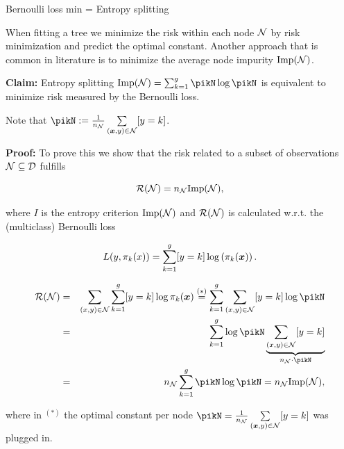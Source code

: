 \begin{vbframe}{Bernoulli loss min = Entropy splitting}

When fitting a tree we minimize the risk within each node $\mathcal{N}$ by risk minimization and predict the optimal constant. Another approach that is common in literature is to minimize the average node impurity $\text{Imp}(\mathcal{N})$. 

\vspace*{0.2cm}

\textbf{Claim:} Entropy splitting $\text{Imp}(\Np) = \sum_{k = 1}^g \pikN \log \pikN$ is equivalent to minimize risk measured by the Bernoulli loss. 

\begin{footnotesize}
Note that $\pikN := \frac{1}{n_{\Np}} \sum\limits_{(\xv,y) \in \Np} [y = k]$. 
\end{footnotesize}

\vspace*{0.2cm}

\textbf{Proof: } To prove this we show that the risk related to a subset of observations $\mathcal{N} \subseteq \mathcal{D}$ fulfills 

\vspace*{- 0.2cm}


$$
  \mathcal{R}(\mathcal{N}) = n_{\mathcal{N}} \text{Imp}(\mathcal{N}),
$$
  
  where $I$ is the entropy criterion $\text{Imp}(\mathcal{N})$ and $\mathcal{R}(\mathcal{N})$ is calculated w.r.t. the (multiclass) Bernoulli loss  

$$
  L(y, \pi_k(x)) = \sum_{k = 1}^g [y = k] \log \left(\pi_k(\bm{x})\right).
$$

\framebreak 

\begin{eqnarray*}
\risk(\Np) &=& \sum_{\xy \in \Np}  \sum_{k = 1}^g [y = k] \log \pi_k(\xv) \overset{(*)}{=} \sum_{k = 1}^g \sum_{\xy \in \Np} [y = k]\log \pikN \\
&=& \sum_{k = 1}^g \log \pikN \underbrace{\sum_{\xy \in \Np} [y = k]}_{n_{\Np}\cdot \pikN } \\
 &=& n_{\Np} \sum_{k = 1}^g \pikN \log \pikN = n_\Np \text{Imp}(\Np), 
\end{eqnarray*} 

where in $^{(*)}$ the optimal constant per node $\pikN = \frac{1}{n_{\Np}} \sum\limits_{(\xv,y) \in \Np} [y = k]$ was plugged in. 



\end{vbframe}







